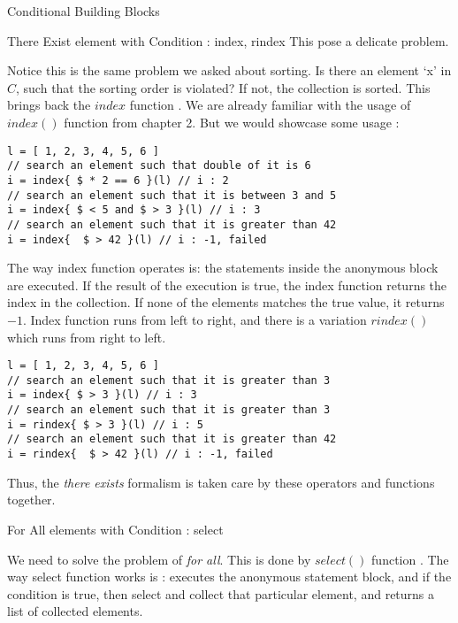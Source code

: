 \begin{section}{Conditional Building Blocks}
\begin{subsection}{There Exist element with Condition : index, rindex }
This pose a delicate problem. 

Notice this is the same problem we asked about sorting. Is there an element `x' in $C$, 
such that the sorting order is violated? If not, the collection is sorted.
This brings back the $index$ function .
We are already familiar with the usage of $index()$ function from chapter 2.
But we would showcase some usage :
 
\begin{lstlisting}[style=JexlStyle]
l = [ 1, 2, 3, 4, 5, 6 ]
// search an element such that double of it is 6
i = index{ $ * 2 == 6 }(l) // i : 2 
// search an element such that it is between 3 and 5 
i = index{ $ < 5 and $ > 3 }(l) // i : 3 
// search an element such that it is greater than 42
i = index{  $ > 42 }(l) // i : -1, failed 
\end{lstlisting}

The way index function operates is: the statements inside the anonymous block are executed.
If the result of the execution is true, the index function returns the index in the collection.
If none of the elements matches the true value, it returns $-1$.
Index function runs from left to right, and there is a variation $rindex()$ 
which runs from right to left.


\begin{lstlisting}[style=JexlStyle]
l = [ 1, 2, 3, 4, 5, 6 ]
// search an element such that it is greater than 3  
i = index{ $ > 3 }(l) // i : 3
// search an element such that it is greater than 3  
i = rindex{ $ > 3 }(l) // i : 5 
// search an element such that it is greater than 42
i = rindex{  $ > 42 }(l) // i : -1, failed 
\end{lstlisting}

Thus, the \emph{there exists} formalism is taken care by these operators and functions together.

\end{subsection}


\begin{subsection}{For All elements with Condition : select }

We need to solve the problem of \emph{for all}. This is done by $select()$ function .
The way select function works is : executes the anonymous statement block, and if the condition is true, 
then select and collect that particular element, and returns a list of collected elements.


\end{subsection}
\end{section}
